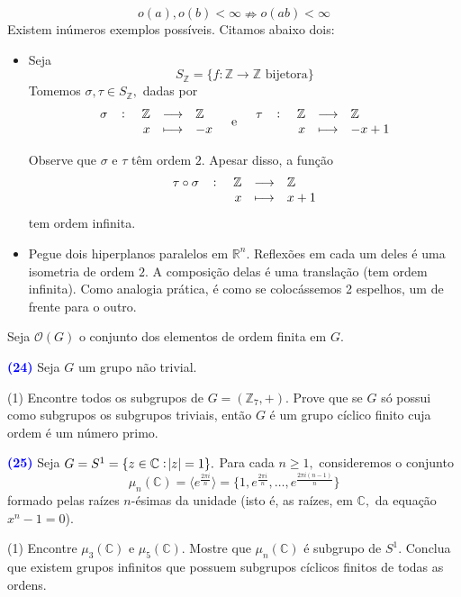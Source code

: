 \documentclass[12pt, a4paper]{article}
\newcommand{\negrito}[1]{\mbox{\boldmath{$#1$}}}
\begin{document}
\begin{tasks}[counter-format={(tsk[a])},label-width=3.6ex, label-format = {\bfseries}, column-sep = {0pt}]
\[
o(a), o(b) < \infty \nRightarrow o(ab) < \infty
\]
\task[\textcolor{Floresta}{$\negrito{(d)} $}] Existem inúmeros exemplos possíveis. Citamos abaixo dois:
\begin{itemize}
    \item Seja
    \[
    S_{\mathbb{Z}} = \{ f \colon \mathbb{Z} \to \mathbb{Z} \mbox{ bijetora} \}
    \]
    Tomemos $\sigma, \tau \in S_{\mathbb{Z}},$ dadas por
    \[
    \fullfunction{\sigma}{\mathbb{Z}}{\mathbb{Z}}{x}{-x} \quad \mbox{e} \quad     \fullfunction{\tau}{\mathbb{Z}}{\mathbb{Z}}{x}{-x+1}
    \]
    
    Observe que $\sigma$ e $\tau$ têm ordem $2.$ Apesar disso, a função
    \[
    \fullfunction{\tau \circ \sigma }{\mathbb{Z}}{\mathbb{Z}}{x}{x+1}
    \]
    tem ordem infinita.
    
    \item Pegue dois hiperplanos paralelos em $\mathbb{R}^n.$ Reflexões em cada um deles é uma isometria de ordem $2$. A composição delas é uma translação (tem ordem infinita). Como analogia prática, é como se colocássemos 2 espelhos, um de frente para o outro.
\end{itemize}
\task[\textcolor{Floresta}{$\negrito{(e)} $}] Seja $\mathcal{O}(G)$ o conjunto dos elementos de ordem finita em $G.$ 
\end{tasks}
\textcolor{blue}{\bf(24)}\label{31} Seja $G$ um grupo não trivial. 
\begin{tasks}[counter-format={(tsk[a])},label-width=3.6ex, label-format = {\bfseries}, column-sep = {0pt}](1)
\task[\textcolor{Floresta}{$\negrito{(a)} $}] Encontre todos os subgrupos de $G = (\mathbb{Z}_7, +).$
\task[\textcolor{Floresta}{$\negrito{(b)} $}] Prove que se $G$ só possui como subgrupos os subgrupos triviais, então $G$ é um grupo cíclico finito cuja ordem é um número primo.%
\end{tasks}
\textcolor{blue}{\bf(25)}\label{32} Seja $G = S^{1} = \{ z \in \mathbb{C} : \abs{z} = 1 \}.$ Para cada $n \ge 1,$ consideremos o conjunto
\[
\mu_n(\mathbb{C}) = \langle e^{\frac{2 \pi i}{n}} \rangle = \{1, e^{\frac{2 \pi i}{n}}, \ldots, e^{\frac{2 \pi i (n-1)}{n}} \}
\]
formado pelas raízes $n$-ésimas da unidade (isto é, as raízes, em $\mathbb{C},$ da equação $x^n - 1 = 0$).
\begin{tasks}[counter-format={(tsk[a])},label-width=3.6ex, label-format = {\bfseries}, column-sep = {0pt}](1)
\task[\textcolor{Floresta}{$\negrito{(a)} $}] Encontre $\mu_3(\mathbb{C})$ e $\mu_5(\mathbb{C}).$
\task[\textcolor{Floresta}{$\negrito{(b)} $}] Mostre que $\mu_n(\mathbb{C})$ é subgrupo de $S^1.$
\task[\textcolor{Floresta}{$\negrito{(c)} $}] Conclua que existem grupos infinitos que possuem subgrupos cíclicos finitos de todas as ordens.
\end{tasks}
\end{document}
